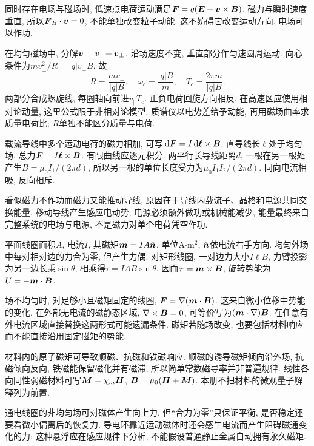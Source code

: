 \label{ch:magneticforce}
同时存在电场与磁场时, 低速点电荷运动满足$\boldsymbol{F}=q(\boldsymbol{E}+\boldsymbol{v}\times\boldsymbol{B})$. 磁力与瞬时速度垂直, 所以$\boldsymbol{F}_B\cdot\boldsymbol{v}=0$, 不能单独改变粒子动能. 这不妨碍它改变运动方向. 电场可以作功.

在均匀磁场中, 分解$\boldsymbol{v}=\boldsymbol{v}_\parallel+\boldsymbol{v}_\perp$. 沿场速度不变, 垂直部分作匀速圆周运动. 向心条件为$mv_\perp^2/R=|q|v_\perp B$, 故
\[
R=\frac{mv_\perp}{|q|B},\quad \omega_c=\frac{|q|B}{m},\quad T_c=\frac{2\pi m}{|q|B}.
\]
两部分合成螺旋线, 每圈轴向前进$v_\parallel T_c$. 正负电荷回旋方向相反. 在高速区应使用相对论动量, 这里公式限于非相对论模型. 质谱仪以电势差给予动能, 再用磁场曲率求质量电荷比; $R$单独不能区分质量与电荷.

载流导线中多个运动电荷的磁力相加, 可写$\,\mathrm d\boldsymbol{F}=I\,\mathrm d\boldsymbol{\ell}\times\boldsymbol{B}$. 直导线长$\ell$处于均匀场, 总力$\boldsymbol{F}=I\boldsymbol{\ell}\times\boldsymbol{B}$. 有限曲线应逐元积分. 两平行长导线距离$d$, 一根在另一根处产生$B=\mu_0I_1/(2\pi d)$, 所以另一根的单位长度受力为$\mu_0I_1I_2/(2\pi d)$. 同向电流相吸, 反向相斥.

看似磁力不作功而磁力又能推动导线, 原因在于导线内载流子、晶格和电源共同交换能量. 移动导线产生感应电动势, 电源必须额外做功或机械能减少, 能量最终来自完整系统的电场与电源, 不是磁力对单个电荷凭空作功.

平面线圈面积$A$, 电流$I$, 其磁矩$\boldsymbol{m}=IA\hat{\boldsymbol{n}}$, 单位A$\cdot$m$^2$, $\hat{\boldsymbol{n}}$依电流右手方向. 均匀外场中每对相对边的力合为零, 但产生力偶. 对矩形线圈, 一对边力大小$I\ell B$, 力臂投影为另一边长乘$\sin\theta$, 相乘得$\tau=IAB\sin\theta$. 因而$\boldsymbol{\tau}=\boldsymbol{m}\times\boldsymbol{B}$, 旋转势能为$U=-\boldsymbol{m}\cdot\boldsymbol{B}$.

场不均匀时, 对足够小且磁矩固定的线圈, $\boldsymbol{F}=\nabla(\boldsymbol{m}\cdot\boldsymbol{B})$. 这来自微小位移中势能的变化. 在外部无电流的磁静态区域, $\nabla\times\boldsymbol{B}=0$, 可等价写为$(\boldsymbol{m}\cdot\nabla)\boldsymbol{B}$. 在任意有外电流区域直接替换这两形式可能遗漏条件. 磁矩若随场改变, 也要包括材料响应而不能直接沿用固定磁矩的势能.

材料内的原子磁矩可导致顺磁、抗磁和铁磁响应. 顺磁的诱导磁矩倾向沿外场, 抗磁倾向反向, 铁磁能保留磁化并有磁滞, 所以简单常数磁导率并非普遍规律. 线性各向同性弱磁材料可写$\boldsymbol{M}=\chi_m\boldsymbol{H}$, $\boldsymbol{B}=\mu_0(\boldsymbol{H}+\boldsymbol{M})$. 本册不把材料的微观量子解释列为前置.

通电线圈的非均匀场可对磁体产生向上力, 但“合力为零”只保证平衡, 是否稳定还要看微小偏离后的恢复力. 导电环靠近运动磁体时还会感生电流而产生阻碍磁通变化的力; 这种悬浮应在感应规律下分析, 不能假设普通静止金属自动拥有永久磁矩.


